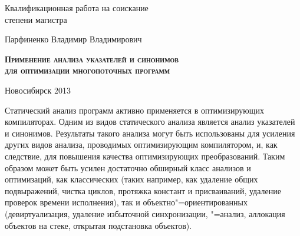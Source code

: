 \documentclass[14pt,titlepage,draft]{extarticle}
\begin{document}
\begin{center}
{      \vspace{1.2cm}

      Квалификационная работа на соискание\\
      степени магистра

      \vspace{0.5cm}

      {\large Парфиненко Владимир Владимирович \par}

      \vspace{1.1cm}

      {\large \scshape \bfseries
        Применение анализа указателей и синонимов\\
        для оптимизации многопоточных программ \par
      }

      \vspace{2.5cm}


      \hfill{}

      \vfill

      Новосибирск 2013
    }
  \end{center}

  \listoftodos

  \tableofcontents


    Статический анализ программ активно применяется в оптимизирующих
    компиляторах. Одним из видов статического анализа является анализ
    указателей и синонимов. Результаты такого анализа могут быть использованы
    для усиления других видов анализа, проводимых оптимизирующим компилятором,
    и, как следствие, для повышения качества оптимизирующих преобразований.
    Таким образом может быть усилен достаточно обширный класс анализов и
    оптимизаций, как классических (таких например, как удаление общих
    подвыражений, чистка циклов, протяжка констант и присваиваний, удаление
    проверок времени исполнения), так и объектно"=ориентированных
    (девиртуализация, удаление избыточной синхронизации, "=анализ,
    аллокация объектов на стеке, открытая подстановка объектов).
\end{document}
